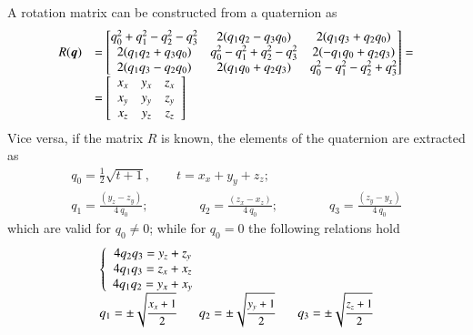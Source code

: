 \documentclass[preprint, 12pt]{elsarticle}
\def\quat#1{{\boldsymbol{#1}}}
\begin{document}
A rotation matrix can be constructed from a quaternion as
\begin{equation}
\begin{array}{rl}
R(\quat{q})& =\left[
	\begin{matrix}
	 q_0^2 + q_1^2 - q_2^2 - q_3^2  &  2(q_1 q_2 - q_3 q_0)   &  2(q_1 q_3 + q_2 q_0)  \cr
	 2(q_1 q_2 + q_3 q_0)  &  q_0^2 - q_1^2 + q_2^2 - q_3^2  &   2(-q_1 q_0 + q_2 q_3) \cr
     2(q_1 q_3 - q_2 q_0)  &  2(q_1 q_0 + q_2 q_3)  & q_0 ^2 -q_1^2 -q_2^2 + q_3^2   
	\end{matrix}
	\right] =\\
&=\left[
\begin{array}{ccc}
        x_{x}            &       y_{x}           &       z_{x}  \\
        x_{y}            &       y_{y}           &       z_{y}  \\
        x_{z}            &       y_{z}           &       z_{z}
\end{array}\right]
\end{array}
\label{new_eq:fromQtoR}
\end{equation}
Vice versa, if the matrix $R$ is known, the elements of the quaternion are extracted as
\begin{equation}
\begin{array}{l}
q_0=\frac{1}{2} \sqrt{t+1},\qquad t=x_{x}+y_{y}+z_{z};\\[2ex]
  q_1=\frac{(y_{z}-z_{y})}{4\: q_0};\qquad \qquad
  q_2=\frac{(z_{x}-x_{z})}{4\: q_0};\qquad \qquad
  q_3=\frac{(z_{y}-y_{x})}{4\: q_0}
\label{eq:fromRtoQ}
\end{array}
\end{equation}
which are valid for $q_0 \neq 0$; while for $q_0=0$ the following relations hold
\begin{equation}
\begin{array}{l}
        \left\{
        \begin{array}{c}
                4 q_2 q_3 =y_{z}+z_{y} \\
                4 q_1 q_3 =z_{x}+x_{z} \\
                4 q_1 q_2 =y_{x}+x_{y}
        \end{array}
        \right.
\ \\
{\small
                q_1=\pm \sqrt{\cfrac{x_{x}+1}{2}} \qquad
                q_2=\pm \sqrt{\cfrac{y_{y}+1}{2}} \qquad
                q_3=\pm \sqrt{\cfrac{z_{z}+1}{2}}
}
\end{array}
\label{eq:fromRtoQ2}
\end{equation}
\end{document}

